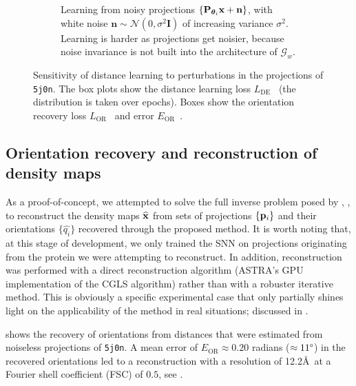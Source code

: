 \begin{figure}[ht!]
\begin{subfigure}[t]{0.47\linewidth}
        \caption{%
            Learning from noisy projections $\{ \mathbf{P}_{{\boldsymbol{\theta}}_i} \mathbf{x} + \mathbf{n} \}$, with white noise $\mathbf{n} \sim \mathcal{N}(0, \sigma^2\mathbf{I})$ of increasing variance $\sigma^2$.
            Learning is harder as projections get noisier, because noise invariance is not built into the architecture of $\mathcal{G}_w$.
        }\label{fig:results:distance-estimation:noise}
    \end{subfigure}
    \caption{%
        Sensitivity of distance learning to perturbations in the projections of \texttt{5j0n}.
        The box plots show the distance learning loss $L_\text{DE}$~ (the distribution is taken over epochs).
        Boxes show the orientation recovery loss $L_\text{OR}$~ and error $E_\text{OR}$~.
    }\label{fig:results:distance-estimation}
\end{figure}


\subsection{Orientation recovery and reconstruction of density maps}\label{sec:results:orientation-recovery:reconstruction}

As a proof-of-concept, we attempted to solve the full inverse problem posed by , \ie, to reconstruct the density maps $\widehat{\mathbf{x}}$ from sets of projections $\{ \mathbf{p}_i \}$ and their orientations $\{ \widehat{q_i} \}$ recovered through the proposed method.
It is worth noting that, at this stage of development, we only trained the SNN on projections originating from the protein we were attempting to reconstruct.
In addition, reconstruction was performed with a direct reconstruction algorithm (ASTRA's GPU implementation of the CGLS algorithm) rather than with a robuster iterative method.
This is obviously a specific experimental case that only partially shines light on the applicability of the method in real situations; discussed in .

 shows the recovery of orientations from distances that were estimated from noiseless projections of \texttt{5j0n}.
A mean error of $E_\text{OR} \approx 0.20$ radians ($\approx 11\degree$) in the recovered orientations led to a reconstruction with a resolution of 12.2\AA\ at a Fourier shell coefficient (FSC) of $0.5$, see .

